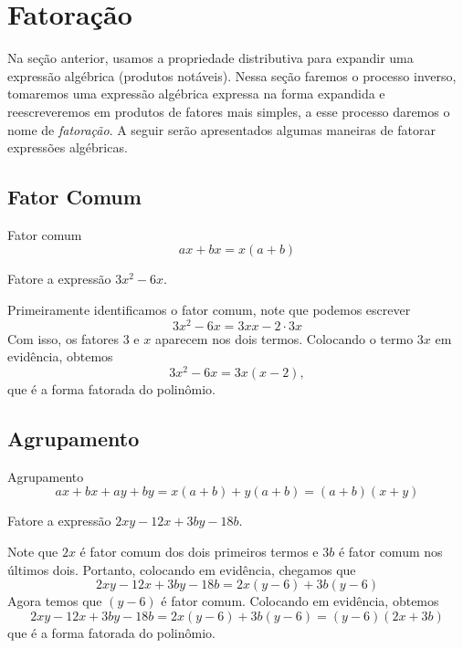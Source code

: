 \section{Fatoração}

Na seção anterior, usamos a propriedade distributiva para expandir uma
expressão algébrica (produtos notáveis). Nessa seção faremos o processo
inverso, tomaremos uma expressão algébrica expressa na forma expandida e
reescreveremos em produtos de fatores mais simples, a esse processo daremos o
nome de \emph{fatoração}.
A seguir serão apresentados algumas maneiras de fatorar expressões algébricas.

\subsection{Fator Comum}

Fator comum
\[
  ax + bx = x(a + b)
\]

\begin{example}
  Fatore a expressão $3x^2-6x$.

  \solution
  Primeiramente identificamos o fator comum, note que podemos escrever
  \[
    3x^2 - 6x = 3xx - 2\cdot3x
  \]
  Com isso, os fatores 3 e $x$ aparecem nos dois termos.
  Colocando o termo $3x$ em evidência, obtemos
  \[
    3x^2 - 6x = 3x(x-2),
  \]
  que é a forma fatorada do polinômio.
\end{example}

\subsection{Agrupamento}

Agrupamento
\[
  ax + bx + ay + by
  = x(a+b) +y(a+b)
  = (a+b)(x+y)
\]

\begin{example}
  Fatore a expressão $2xy-12x+3by-18b$.

  \solution
  Note que $2x$ é fator comum dos dois primeiros termos e $3b$ é fator comum
  nos últimos dois. Portanto, colocando em evidência, chegamos que
  \[
    2xy-12x+3by-18b= 2x(y-6)+3b(y-6)
  \]
  Agora temos que $(y-6)$ é fator comum. Colocando em evidência, obtemos
  \[
    2xy-12x+3by-18b= 2x(y-6)+3b(y-6)=(y-6)(2x+3b)
  \]
  que é a forma fatorada do polinômio.
\end{example}


